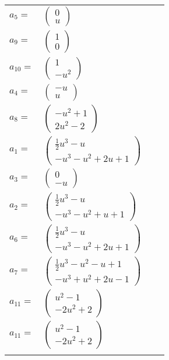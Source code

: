 \documentclass[1p]{elsarticle_modified}
\theoremstyle{definition}
\begin{document}
\begin{tabular}{m{7pt} m{180pt} m{7pt} m{180pt} }
\flushright $a_{5}=$&$\begin{pmatrix}0\\u\end{pmatrix}$ \\
\flushright $a_{9}=$&$\begin{pmatrix}1\\0\end{pmatrix}$ \\
\flushright $a_{10}=$&$\begin{pmatrix}1\\- u^2\end{pmatrix}$ \\
\flushright $a_{4}=$&$\begin{pmatrix}- u\\u\end{pmatrix}$ \\
\flushright $a_{8}=$&$\begin{pmatrix}- u^2+1\\2 u^2-2\end{pmatrix}$ \\
\flushright $a_{1}=$&$\begin{pmatrix}\frac{1}{2} u^3- u\\- u^3- u^2+2 u+1\end{pmatrix}$ \\
\flushright $a_{3}=$&$\begin{pmatrix}0\\- u\end{pmatrix}$ \\
\flushright $a_{2}=$&$\begin{pmatrix}\frac{1}{2} u^3- u\\- u^3- u^2+u+1\end{pmatrix}$ \\
\flushright $a_{6}=$&$\begin{pmatrix}\frac{1}{2} u^3- u\\- u^3- u^2+2 u+1\end{pmatrix}$ \\
\flushright $a_{7}=$&$\begin{pmatrix}\frac{1}{2} u^3- u^2- u+1\\- u^3+u^2+2 u-1\end{pmatrix}$ \\
\flushright $a_{11}=$&$\begin{pmatrix}u^2-1\\-2 u^2+2\end{pmatrix}$\\ \flushright $a_{11}=$&$\begin{pmatrix}u^2-1\\-2 u^2+2\end{pmatrix}$\\&\end{tabular}
\end{document}
